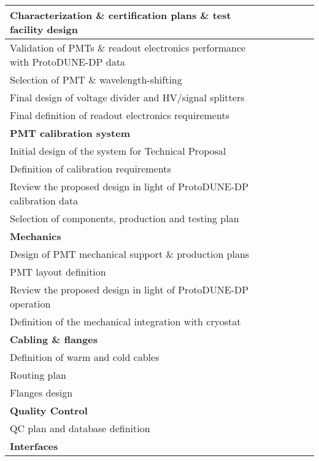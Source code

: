 \begin{table}[htpb]
\begin{center}
\begin{tabular}{|l|c|c|c|c|c|c|}
Characterization \& certification plans \& test facility design & & &  \cellcolor{gray} & & & \\ \hline
Validation of PMTs \& readout electronics performance with ProtoDUNE-DP data & & & & &  \cellcolor{gray} & \\ \hline
Selection of PMT \& wavelength-shifting & & & & &  \cellcolor{gray} & \\ \hline
Final design of voltage divider and HV/signal splitters & & & & &  \cellcolor{gray} & \\ \hline
Final definition of readout electronics requirements & & & & &  \cellcolor{gray} & \\ \hline
\multicolumn{7}{|l|}{\bf PMT calibration system} \\ \hline
Initial design of the system for Technical Proposal & &  \cellcolor{gray} & & & & \\ \hline
Definition of calibration requirements & & &  \cellcolor{gray} & & & \\ \hline
Review the proposed design in light of ProtoDUNE-DP calibration data & & & &  \cellcolor{gray} & & \\ \hline
Selection of components, production and testing plan & & & &  \cellcolor{gray} & & \\ \hline
\multicolumn{7}{|l|}{\bf Mechanics} \\ \hline
Design of PMT mechanical support \& production plans & &  \cellcolor{gray} & & & & \\ \hline
PMT layout definition & & &  \cellcolor{gray} & & & \\ \hline
Review the proposed design in light of ProtoDUNE-DP operation & & & & &  \cellcolor{gray} & \\ \hline
Definition of the mechanical integration with cryostat & & & & & &  \cellcolor{gray} \\ \hline
\multicolumn{7}{|l|}{\bf Cabling \& flanges} \\ \hline
Definition of warm and cold cables & &  \cellcolor{gray} & & & & \\ \hline
Routing plan & & & & &  \cellcolor{gray} & \\ \hline
Flanges design & & & & &  \cellcolor{gray} & \\ \hline
\multicolumn{7}{|l|}{\bf Quality Control} \\ \hline
QC plan and database definition & &  \cellcolor{gray} & & & & \\ \hline
\multicolumn{7}{|l|}{\bf Interfaces} \\ \hline

\end{tabular}
\end{center}
\end{table}
